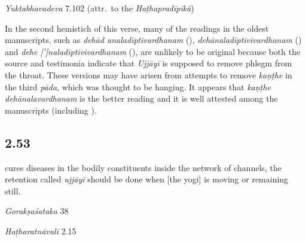 \begin{ekdosis}
\begin{testimonia}[hp02_052]
\emph{Yuktabhavadeva} 7.102 (attr.~to the \emph{Haṭhapradīpikā})

\begin{versinnote} 
\end{versinnote}

\end{testimonia}

\begin{philcomm}[hp02_052]
In the second hemistich of this verse, many of the readings in the oldest manuscripts, such as \emph{dehād analadīptivardhanam} (), \emph{dehānaladīptivivardhanam} () and \emph{dehe [’]naladīptivivardhanam} (), are unlikely to be original because both the source and testimonia indicate that \emph{Ujjāyī} is supposed to remove phlegm from the throat. These versions may have arisen from attempts to remove \emph{kaṇṭhe} in the third \emph{pāda}, which was thought to be hanging. It appears that \emph{kaṇṭhe dehānalavardhanam} is the better reading and it is well attested among the manuscripts (including \textalpha).
\end{philcomm}

\subsection*{2.53}
\begin{translation}[hp02_053]
[and] cures diseases in the bodily constituents inside the network of channels,
the retention called \emph{ujjāyī} should be done when [the yogi] is moving or remaining still.
\end{translation}

\begin{sources}[hp02_053]
\emph{Gorakṣaśataka} 38

\begin{versinnote}
\end{versinnote}
\end{sources}

\begin{testimonia}[hp02_053]
\emph{Haṭharatnāvalī} 2.15

\begin{versinnote}
\tl{nāḍījālodarādhātu° ] nāḍījalodaradhātu° \textup{J,P;} nāḍījalodaraṃ dhātu° \textup{N, n1, n4}\\+}
\end{versinnote}


\end{testimonia}
\end{ekdosis}
